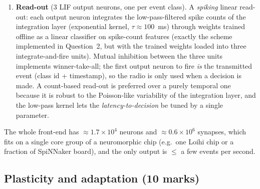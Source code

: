 \documentclass[11pt,a4paper]{article}
\begin{document}
\begin{enumerate}
\item \textbf{Read-out} (3 LIF output neurons, one per event class). A \emph{spiking} linear read-out: each output neuron integrates the low-pass-filtered spike counts of the integration layer (exponential kernel, $\tau\approx 100$~ms) through weights trained offline as a linear classifier on spike-count features (exactly the scheme implemented in Question~2, but with the trained weights loaded into three integrate-and-fire units). Mutual inhibition between the three units implements winner-take-all; the first output neuron to fire \emph{is} the transmitted event (class id + timestamp), so the radio is only used when a decision is made. A count-based read-out is preferred over a purely temporal one because it is robust to the Poisson-like variability of the integration layer, and the low-pass kernel lets the \emph{latency-to-decision} be tuned by a single parameter.
\end{enumerate}
The whole front-end has $\approx 1.7\times10^4$ neurons and $\approx 0.6\times10^6$ synapses, which fits on a single core group of a neuromorphic chip (e.g.\ one Loihi chip or a fraction of SpiNNaker board), and the only output is $\le$ a few events per second.

\subsection{Plasticity and adaptation (10 marks)}
\label{sec:plasticity}
\end{document}
